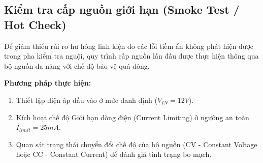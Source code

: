     \subsection{Kiểm tra cấp nguồn giới hạn (Smoke Test / Hot Check)}
        Để giảm thiểu rủi ro hư hỏng linh kiện do các lỗi tiềm ẩn không phát hiện được trong pha kiểm tra nguội, quy trình cấp nguồn lần đầu được thực hiện thông qua bộ nguồn đa năng với chế độ bảo vệ quá dòng.

        \textbf{Phương pháp thực hiện:}
        \begin{enumerate}
            \item Thiết lập điện áp đầu vào ở mức danh định ($V_{IN} = 12V$).
            \item Kích hoạt chế độ Giới hạn dòng điện (Current Limiting) ở ngưỡng an toàn $I_{limit} = 25mA$.
            \item Quan sát trạng thái chuyển đổi chế độ của bộ nguồn (CV - Constant Voltage hoặc CC - Constant Current) để đánh giá tình trạng bo mạch.
        \end{enumerate}

